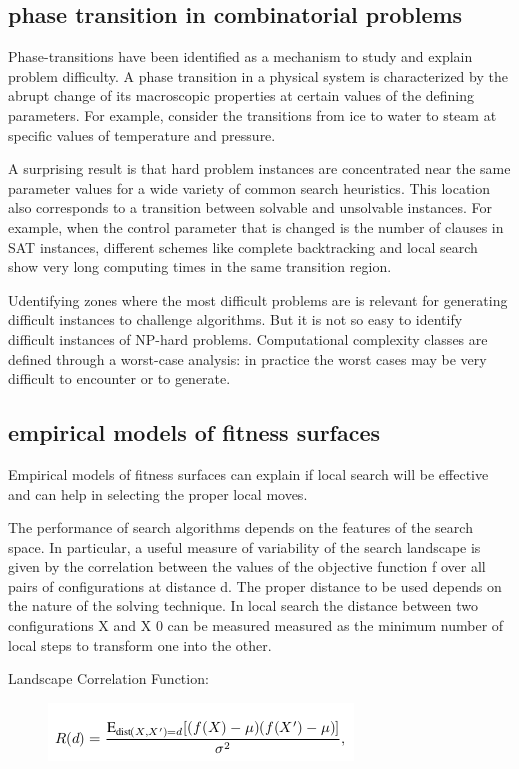 \documentclass[10pt]{article}
\begin{document}
\subsection{phase transition in combinatorial problems}
Phase-transitions have been identified as a mechanism to study and explain problem difficulty. A phase transition in a physical system is characterized by the abrupt change of its macroscopic properties at certain values of the defining parameters. For example, consider the transitions from ice to water to steam at specific values of temperature and pressure.

A surprising result is that hard problem instances are concentrated near the same parameter values for a wide variety of common search
heuristics. This location also corresponds to a transition between solvable and unsolvable instances. For example, when the control parameter that is changed is the number of clauses in SAT instances, different schemes like complete backtracking and local search show very long computing times in the same transition region.

Udentifying zones where the most difficult problems are is relevant
for generating difficult instances to challenge algorithms. 
But it is not so easy to identify difficult instances of NP-hard problems. Computational complexity classes are defined through a worst-case analysis: in practice the worst cases may be very difficult to encounter or to generate.

\subsection{empirical models of fitness surfaces}
Empirical models of fitness surfaces can explain if local search will be effective and can help in selecting the proper local moves.

The performance of search algorithms depends on the features of the search space. In particular, a useful measure of variability of the search landscape is given by the correlation between the values of the objective function f over all pairs of configurations at distance d. The proper distance to be used depends on the nature of the solving technique. In local search the distance between two configurations X and X 0 can be measured measured as the minimum number of local steps to transform one into the other. 

Landscape Correlation Function:

\begin{figure}[H]
\includegraphics[scale=0.60]{landscape}
\centering
\end{figure}
\end{document}
